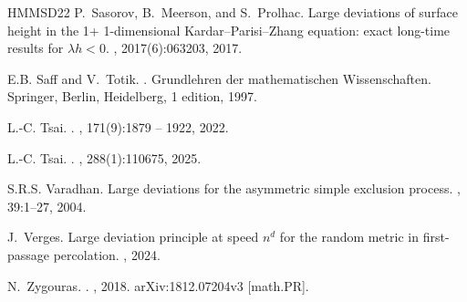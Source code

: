 \documentclass[reqno,11pt]{amsart}
\numberwithin{equation}{section}
\theoremstyle{definition}
\begin{document}
\begin{thebibliography}{HMMSD22}
P.~Sasorov, B.~Meerson, and S.~Prolhac.
\newblock Large deviations of surface height in the 1+ 1-dimensional {Kardar--Parisi--Zhang} equation: exact long-time results for $\lambda h< 0$.
, 2017(6):063203, 2017.

E.B. Saff and V.~Totik.
.
\newblock Grundlehren der mathematischen Wissenschaften. Springer, Berlin, Heidelberg, 1 edition, 1997.

L.-C. Tsai.
.
, 171(9):1879 -- 1922, 2022.

L.-C. Tsai.
.
, 288(1):110675, 2025.

S.R.S. Varadhan.
\newblock Large deviations for the asymmetric simple exclusion process.
, 39:1--27, 2004.

J.~Verges.
\newblock Large deviation principle at speed $ n^d $ for the random metric in first-passage percolation.
, 2024.

N.~Zygouras.
.
, 2018.
\newblock arXiv:1812.07204v3 [math.PR].



\end{thebibliography}
\end{document}
